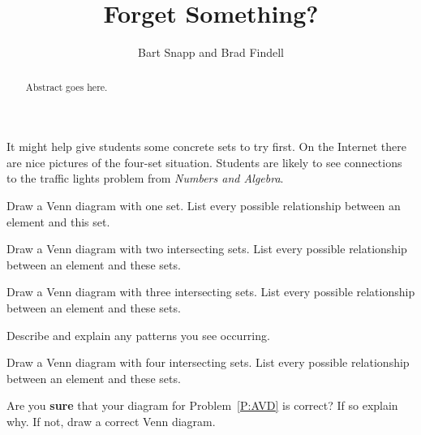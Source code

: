 \documentclass{ximera}
\title{Forget Something?}
\author{Bart Snapp and Brad Findell}
\begin{document}
\begin{abstract}
Abstract goes here.  
\end{abstract}
\maketitle


\begin{instructorIntro}
It might help give students some concrete sets to try first.  On the Internet there are nice pictures of the four-set situation. Students are likely to see connections to the traffic lights problem from \emph{Numbers and Algebra}.
\end{instructorIntro}

\begin{problem} 
Draw a Venn diagram with one set. List every possible relationship
between an element and this set. 
\end{problem}

\begin{problem} 
Draw a Venn diagram with two intersecting sets. List every possible
relationship between an element and these sets.
\end{problem}


\begin{problem} 
Draw a Venn diagram with three intersecting sets. List every possible
relationship between an element and these sets.
\end{problem}

\begin{problem}
Describe and explain any patterns you see occurring.
\end{problem}

\begin{problem}\label{P:AVD}
Draw a Venn diagram with four intersecting sets. List every possible
relationship between an element and these sets.
\end{problem}

\begin{problem}
Are you \textbf{sure} that your diagram for Problem~\ref{P:AVD} is
correct? If so explain why. If not, draw a correct Venn diagram.
\end{problem}
\end{document}
